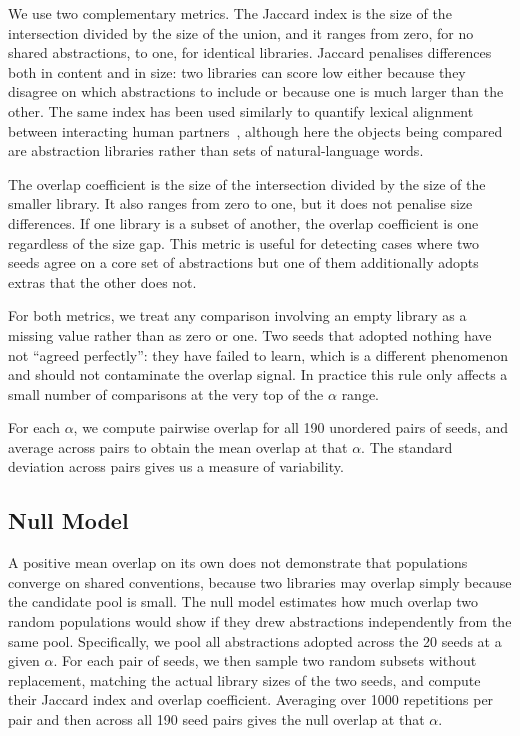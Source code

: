We use two complementary metrics. The Jaccard index is the size of the intersection divided by the size of the union, and it ranges from zero, for no shared abstractions, to one, for identical libraries. Jaccard penalises differences both in content and in size: two libraries can score low either because they disagree on which abstractions to include or because one is much larger than the other. The same index has been used similarly to quantify lexical alignment between interacting human partners~\cite{ji_ad_2025}, although here the objects being compared are abstraction libraries rather than sets of natural-language words.

The overlap coefficient is the size of the intersection divided by the size of the smaller library. It also ranges from zero to one, but it does not penalise size differences. If one library is a subset of another, the overlap coefficient is one regardless of the size gap. This metric is useful for detecting cases where two seeds agree on a core set of abstractions but one of them additionally adopts extras that the other does not.

For both metrics, we treat any comparison involving an empty library as a missing value rather than as zero or one. Two seeds that adopted nothing have not ``agreed perfectly'': they have failed to learn, which is a different phenomenon and should not contaminate the overlap signal. In practice this rule only affects a small number of comparisons at the very top of the $\alpha$ range.

For each $\alpha$, we compute pairwise overlap for all 190 unordered pairs of seeds, and average across pairs to obtain the mean overlap at that $\alpha$. The standard deviation across pairs gives us a measure of variability.

\subsection{Null Model}
\label{sec:rq2-null}

A positive mean overlap on its own does not demonstrate that populations converge on shared conventions, because two libraries may overlap simply because the candidate pool is small. The null model estimates how much overlap two random populations would show if they drew abstractions independently from the same pool. Specifically, we pool all abstractions adopted across the 20 seeds at a given $\alpha$. For each pair of seeds, we then sample two random subsets without replacement, matching the actual library sizes of the two seeds, and compute their Jaccard index and overlap coefficient. Averaging over 1000 repetitions per pair and then across all 190 seed pairs gives the null overlap at that $\alpha$.


